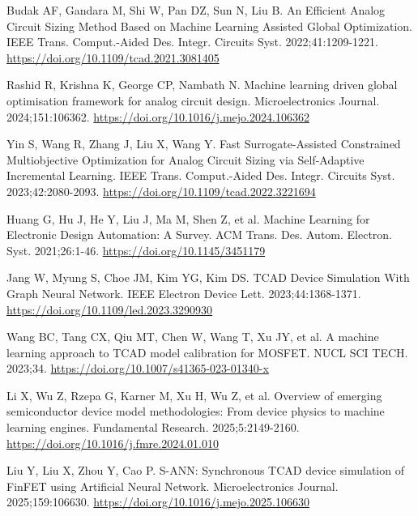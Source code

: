Budak AF, Gandara M, Shi W, Pan DZ, Sun N, Liu B. An Efficient Analog Circuit Sizing Method Based on Machine Learning Assisted Global Optimization. IEEE Trans. Comput.-Aided Des. Integr. Circuits Syst. 2022;41:1209-1221.
\href{https://doi.org/10.1109/tcad.2021.3081405}{https://doi.org/10.1109/tcad.2021.3081405}

Rashid R, Krishna K, George CP, Nambath N. Machine learning driven global optimisation framework for analog circuit design. Microelectronics Journal. 2024;151:106362.
\href{https://doi.org/10.1016/j.mejo.2024.106362}{https://doi.org/10.1016/j.mejo.2024.106362}

Yin S, Wang R, Zhang J, Liu X, Wang Y. Fast Surrogate-Assisted Constrained Multiobjective Optimization for Analog Circuit Sizing via Self-Adaptive Incremental Learning. IEEE Trans. Comput.-Aided Des. Integr. Circuits Syst. 2023;42:2080-2093.
\href{https://doi.org/10.1109/tcad.2022.3221694}{https://doi.org/10.1109/tcad.2022.3221694}

Huang G, Hu J, He Y, Liu J, Ma M, Shen Z, et al. Machine Learning for Electronic Design Automation: A Survey. ACM Trans. Des. Autom. Electron. Syst. 2021;26:1-46.
\href{https://doi.org/10.1145/3451179}{https://doi.org/10.1145/3451179}

Jang W, Myung S, Choe JM, Kim YG, Kim DS. TCAD Device Simulation With Graph Neural Network. IEEE Electron Device Lett. 2023;44:1368-1371.
\href{https://doi.org/10.1109/led.2023.3290930}{https://doi.org/10.1109/led.2023.3290930}

Wang BC, Tang CX, Qiu MT, Chen W, Wang T, Xu JY, et al. A machine learning approach to TCAD model calibration for MOSFET. NUCL SCI TECH. 2023;34.
\href{https://doi.org/10.1007/s41365-023-01340-x}{https://doi.org/10.1007/s41365-023-01340-x}

Li X, Wu Z, Rzepa G, Karner M, Xu H, Wu Z, et al. Overview of emerging semiconductor device model methodologies: From device physics to machine learning engines. Fundamental Research. 2025;5:2149-2160.
\href{https://doi.org/10.1016/j.fmre.2024.01.010}{https://doi.org/10.1016/j.fmre.2024.01.010}

Liu Y, Liu X, Zhou Y, Cao P. S-ANN: Synchronous TCAD device simulation of FinFET using Artificial Neural Network. Microelectronics Journal. 2025;159:106630.
\href{https://doi.org/10.1016/j.mejo.2025.106630}{https://doi.org/10.1016/j.mejo.2025.106630}

